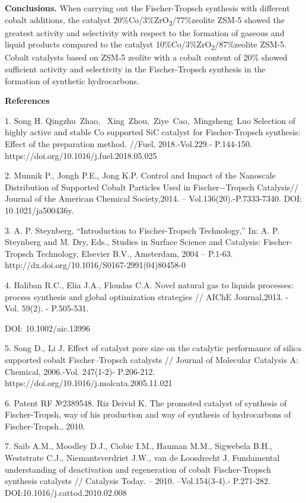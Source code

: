 \textbf{Conclusions.} When carrying out the Fischer-Tropsch synthesis
with different cobalt additions, the catalyst
20\%Co/3\%ZrO\textsubscript{2}/77\%zeolite ZSM-5 showed the greatest
activity and selectivity with respect to the formation of gaseous and
liquid products compared to the catalyst
10\%Co/3\%ZrO\textsubscript{2}/87\%zeolite ZSM-5. Cobalt catalysts based
on ZSM˗5 zeolite with a cobalt content of 20\% showed sufficient
activity and selectivity in the Fischer-Tropsch synthesis in the
formation of synthetic hydrocarbons.

\textbf{References}

1. Song H. Qingzhu~Zhao,~ Xing~Zhou,~Ziye~Cao,~Mingsheng~Luo Selection
of highly active and stable Co supported SiC catalyst for
Fischer-Tropsch synthesis: Effect of the preparation method. //Fuel,
2018.-Vol.229.- P.144-150. https://doi.org/10.1016/j.fuel.2018.05.025

2. Munnik P., Jongh P.E., Jong K.P. Control and Impact of the Nanoscale
Distribution of Supported Cobalt Particles Used in Fischer−Tropsch
Catalysis// Journal of the American Chemical Society,2014. --
Vol.136(20).-P.7333-7340. DOI: 10.1021/ja500436y.~

3. A. P. Steynberg, ``Introduction to Fischer-Tropsch Technology,'' In:
A. P. Steynberg and M. Dry, Eds., Studies in Surface Science and
Catalysis: Fischer-Tropsch Technology, Elsevier B.V., Amsterdam, 2004 --
P.1-63. http://dx.doi.org/10.1016/S0167-2991(04)80458-0

4. Baliban R.C., Elia J.A., Floudas C.A. Novel natural gas to liquids
processes: process synthesis and global optimization strategies // AIChE
Journal,2013. - Vol. 59(2). - P.505-531.

DOI: 10.1002/aic.13996

5. Song D., Li J. Effect of catalyst pore size on the catalytic
performance of silica supported cobalt Fischer--Tropsch catalysts //
Journal of Molecular Catalysis A: Chemical, 2006.-Vol. 247(1-2)-
P.206-212. https://doi.org/10.1016/j.molcata.2005.11.021

6. Patent RF №2389548. Riz Deivid K. The promoted catalyst of synthesis
of Fischer-Tropsh, way of his production and way of synthesis of
hydrocarbons of Fischer-Tropsh., 2010.

7. Saib A.M., Moodley D.J., Ciobic I.M., Hauman M.M., Sigwebela B.H.,
Weststrate C.J., Niemantsverdriet J.W., van de Loosdrecht J. Fundamental
understanding of deactivation and regeneration of cobalt Fischer-Tropsch
synthesis catalysts // Catalysis Today. -- 2010. --Vol.154(3-4).-
P.271-282. DOI:10.1016/j.cattod.2010.02.008

